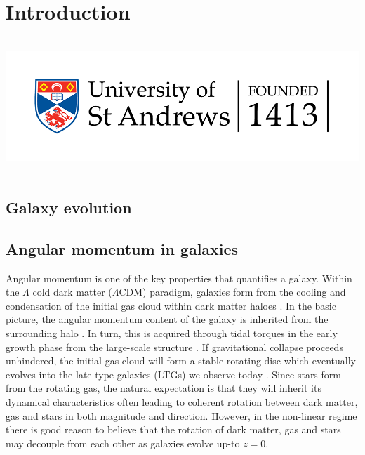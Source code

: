 \chapter{Introduction}
\vspace{-5in}
\includegraphics[height=2.0in]{thesis/latex/st_a_logo_.png}
\vspace{3in}

\label{ch:intro}
\section{Galaxy evolution} \label{sec:gal_evo_intro}

\section{Angular momentum in galaxies} \label{sec:ang_mom_intro}
Angular momentum is one of the key properties that quantifies a galaxy. Within the $\Lambda$ cold dark matter ($\Lambda$CDM) paradigm, galaxies form from the cooling and condensation of the initial gas cloud within dark matter haloes \citep{white1978, mo1998}. In the basic picture, the angular momentum content of the galaxy is inherited from the surrounding halo \citep[][]{fall1980}. In turn, this is acquired through tidal torques in the early growth phase from the large-scale structure \citep[e.g.][]{peebles1969, Doroshkevich1970}. If gravitational collapse proceeds unhindered, the initial gas cloud will form a stable rotating disc which eventually evolves into the late type galaxies (LTGs) we observe today \citep{white1978}. Since stars form from the rotating gas, the natural expectation is that they will inherit its dynamical characteristics often leading to coherent rotation between dark matter, gas and stars in both magnitude and direction. However, in the non-linear regime there is good reason to believe that the rotation of dark matter, gas and stars may decouple from each other as galaxies evolve up-to $z=0$. 

